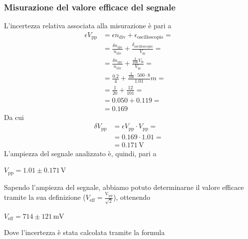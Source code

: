 \documentclass[a4paper]{article}
\begin{document}
			\subsubsection{Misurazione del valore efficace del segnale}
				L'incertezza relativa associata alla misurazione è pari a 
				\begin{equation*}
					\begin{split}
						\epsilon V_{\mathrm{pp}} &= \epsilon n_{\mathrm{div}} + \epsilon_{\mathrm{oscilloscopio}} = \\
												 &= \frac{\delta n_{\mathrm{div}}}{n_{\mathrm{div}}} + \frac{\delta_{\mathrm{oscilloscopio}}}{V_{\mathrm{m}}} = \\
												 &= \frac{\delta n_{\mathrm{div}}}{n_{\mathrm{div}}} + \frac{\frac{3}{100}V_{\mathrm{fs}}}{V_{\mathrm{m}}} = \\
												 &= \frac{0.2}{4} + \frac{\frac{3}{100} \cdot 500 \cdot 8}{1.01}m = \\
												 &= \frac{1}{20} + \frac{12}{101} = \\
												 &= 0.050 + 0.119 = \\
												 &= 0.169
					\end{split}
				\end{equation*}
				Da cui
				\begin{equation*}
					\begin{split}
						\delta V_{\mathrm{pp}} &= \epsilon V_{\mathrm{pp}} \cdot V_{\mathrm{pp}} = \\
											   &= 0.169 \cdot 1.01 = \\
											   &= 0.171 \, \mathrm{V}
					\end{split}
				\end{equation*}
				L'ampiezza del segnale analizzato è, quindi, pari a
				\newline
				\begin{center}
					$ V_{\mathrm{pp}} = 1.01 \pm 0.171 \, \mathrm{V} $
				\end{center}
				\newline
				Sapendo l'ampiezza del segnale, abbiamo potuto determinarne il valore efficace tramite la sua definizione ($ V_{\mathrm{eff}} = \mathrm{\frac{V_{pp}}{\sqrt{2}}} $), ottenendo
				\newline
				\begin{center}
					$ V_{\mathrm{eff}} = 714 \pm 121 \, \mathrm{mV} $
				\end{center}
				\newline
				Dove l'incertezza è stata calcolata tramite la formula
\end{document}
